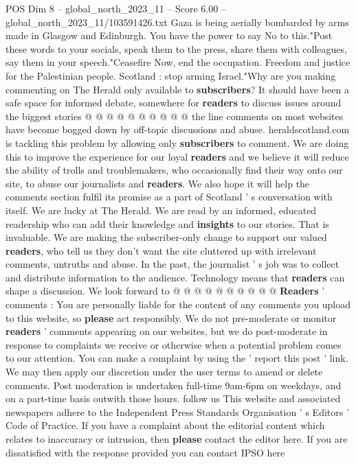 \begin{textsample}{POS Dim 8 – global\_north\_2023\_11 – Score 6.00 – global\_north\_2023\_11/103591426.txt}
Gaza is being aerially bombarded by arms made in Glasgow and Edinburgh.
You have the power to say No to this."Post these words to your socials, speak them to the press, share them with colleagues, say them in your speech."Ceasefire Now, end the occupation.
Freedom and justice for the Palestinian people.
Scotland : stop arming Israel."Why are you making commenting on The Herald only available to \textbf{subscribers}?
It should have been a safe space for informed debate, somewhere for \textbf{readers} to discuss issues around the biggest stories @ @ @ @ @ @ @ @ @ @ the line comments on most websites have become bogged down by off-topic discussions and abuse. heraldscotland.com is tackling this problem by allowing only \textbf{subscribers} to comment.
We are doing this to improve the experience for our loyal \textbf{readers} and we believe it will reduce the ability of trolls and troublemakers, who occasionally find their way onto our site, to abuse our journalists and \textbf{readers}.
We also hope it will help the comments section fulfil its promise as a part of Scotland ' s conversation with itself.
We are lucky at The Herald.
We are read by an informed, educated readership who can add their knowledge and \textbf{insights} to our stories.
That is invaluable.
We are making the subscriber-only change to support our valued \textbf{readers}, who tell us they don't want the site cluttered up with irrelevant comments, untruths and abuse.
In the past, the journalist ' s job was to collect and distribute information to the audience.
Technology means that \textbf{readers} can shape a discussion.
We look forward to @ @ @ @ @ @ @ @ @ @ \textbf{Readers} ' comments : You are personally liable for the content of any comments you upload to this website, so \textbf{please} act responsibly.
We do not pre-moderate or monitor \textbf{readers} ' comments appearing on our websites, but we do post-moderate in response to complaints we receive or otherwise when a potential problem comes to our attention.
You can make a complaint by using the ' report this post ' link.
We may then apply our discretion under the user terms to amend or delete comments.
Post moderation is undertaken full-time 9am-6pm on weekdays, and on a part-time basis outwith those hours. follow us This website and associated newspapers adhere to the Independent Press Standards Organisation ' s Editors ' Code of Practice.
If you have a complaint about the editorial content which relates to inaccuracy or intrusion, then \textbf{please} contact the editor here.
If you are dissatisfied with the response provided you can contact IPSO here

\end{textsample}
